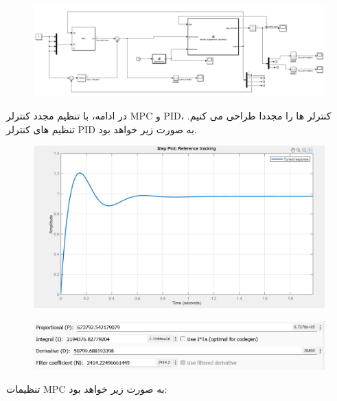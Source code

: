 \begin{figure}
	\centering
	\includegraphics[width=1\linewidth]{../img/19}
	\caption{}
	\label{fig:19}
\end{figure}
در ادامه، با تنظیم مجدد کنترلر MPC و PID، کنترلر ها را مجددا طراحی می کنیم. تنظیم های کنترلر PID به صورت زیر خواهد بود.
\begin{figure}
	\centering
	\includegraphics[width=1\linewidth]{../img/20}
	\caption{}
	\label{fig:20}
\end{figure}

\begin{figure}
	\centering
	\includegraphics[width=1\linewidth]{../img/21}
	\caption{}
	\label{fig:21}
\end{figure}
تنظیمات MPC به صورت زیر خواهد بود:

